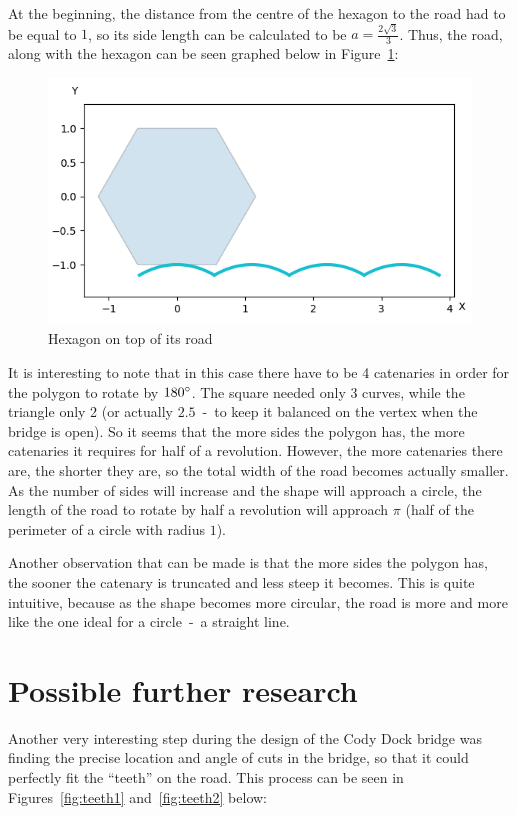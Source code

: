 \documentclass[12pt]{article}
\begin{document}
        At the beginning, the distance from the centre of the hexagon to the road had to be equal to $1$, so its side length can be calculated to be $a=\frac{2\sqrt{3}}{3}$. Thus, the road, along with the hexagon can be seen graphed below in Figure~\ref{fig:hexagon}:
        \begin{figure}[H]
            \centering
            \includegraphics[width=0.8\linewidth]{images/hexagon_bridge.png}
            \caption{Hexagon on top of its road}\label{fig:hexagon}
        \end{figure}

        It is interesting to note that in this case there have to be 4 catenaries in order for the polygon to rotate by $180\degree$. The square needed only 3 curves, while the triangle only 2 (or actually $2.5$~-~to keep it balanced on the vertex when the bridge is open). So it seems that the more sides the polygon has, the more catenaries it requires for half of a revolution. However, the more catenaries there are, the shorter they are, so the total width of the road becomes actually smaller. As the number of sides will increase and the shape will approach a circle, the length of the road to rotate by half a revolution will approach $\pi$ (half of the perimeter of a circle with radius $1$).

        Another observation that can be made is that the more sides the polygon has, the sooner the catenary is truncated and less steep it becomes. This is quite intuitive, because as the shape becomes more circular, the road is more and more like the one ideal for a circle~-~a straight line.

    \section{Possible further research}

        Another very interesting step during the design of the Cody Dock bridge was finding the precise location and angle of cuts in the bridge, so that it could perfectly fit the ``teeth'' on the road. This process can be seen in Figures~\ref{fig:teeth1} and~\ref{fig:teeth2} below:
\end{document}
